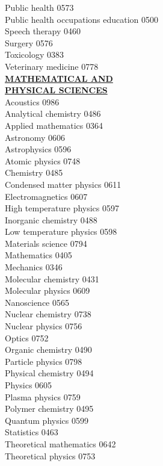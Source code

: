 \documentclass[9pt,twoside]{article}
\newcommand{\categoryheading}[1]{{\fontsize{8}{11}\selectfont \textbf{\uline{#1}}}}
\begin{document}
\begin{multicols}{3}
Public health \hfill 0573 \\
Public health occupations
education \hfill 0500 \\
Speech therapy \hfill 0460 \\
Surgery \hfill 0576 \\
Toxicology \hfill 0383 \\
Veterinary medicine \hfill 0778 \\
\clearpage
\categoryheading{MATHEMATICAL AND \\
PHYSICAL SCIENCES} \\
Acoustics \hfill 0986 \\
Analytical chemistry \hfill 0486 \\
Applied mathematics \hfill 0364 \\
Astronomy \hfill 0606 \\
Astrophysics \hfill 0596 \\
Atomic physics \hfill 0748 \\
Chemistry \hfill 0485 \\
Condensed matter physics \hfill 0611 \\
Electromagnetics \hfill 0607 \\
High temperature physics \hfill 0597 \\
Inorganic chemistry \hfill 0488 \\
Low temperature physics \hfill 0598 \\
Materials science \hfill 0794 \\
Mathematics \hfill 0405 \\
Mechanics \hfill 0346 \\
Molecular chemistry \hfill 0431 \\
Molecular physics \hfill 0609 \\
Nanoscience \hfill 0565 \\
Nuclear chemistry \hfill 0738 \\
Nuclear physics \hfill 0756 \\
Optics \hfill 0752 \\
Organic chemistry \hfill 0490 \\
Particle physics \hfill 0798 \\
Physical chemistry \hfill 0494 \\
Physics \hfill 0605 \\
Plasma physics \hfill 0759 \\
Polymer chemistry \hfill 0495 \\
Quantum physics \hfill 0599 \\
Statistics \hfill 0463 \\
Theoretical mathematics \hfill 0642 \\
Theoretical physics \hfill 0753 \\
\columnbreak \\
\columnbreak \\
\end{multicols}
\end{document}
